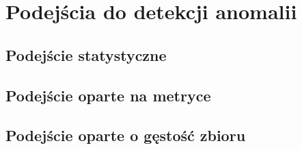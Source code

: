 \section{Podejścia do detekcji anomalii}

\subsection{Podejście statystyczne}
\subsection{Podejście oparte na metryce}
\subsection{Podejście oparte o gęstość zbioru}
